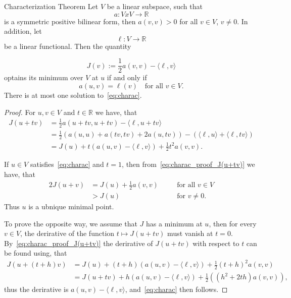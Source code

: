 
\begin{thmx}{Characterization Theorem}
\label{thm:charac_theorem}
    Let $V$ be a linear subspace, such that
        \[
            a: VxV \rightarrow \mathbb{R}
        \]
    is a symmetric positive bilinear form, then $a(v,v)>0$ for all $v \in V$, $v \neq 0$. In addition, let
        \[
            \ell: V \rightarrow \mathbb{R}
        \]
    be a linear functional. Then the quantity

        \[
            J(v):=\frac{1}{2} a(v,v) - \langle\ell,v\rangle 
        \]
    optains its minimum over $V$ at $u$ if and only if
        \begin{equation}
        \label{eq:charac}
            a(u,v) = \ell(v) \quad \text{for all } v \in V.
        \end{equation}
    There is at most one solution to~\eqref{eq:charac}.
\end{thmx}

\begin{proof}

    For $u,v \in V$ and $t \in \mathbb{R}$ we have, that
    \begin{align}
        J(u+tv) &= \frac{1}{2} a(u+tv,u+tv) - \langle\ell,u+tv\rangle \nonumber \\
        &= \frac{1}{2} \left( a(u,u) + a(tv,tv) + 2a(u,tv) \right) - \left( \langle \ell,u\rangle + \langle\ell,tv\rangle \right) \nonumber \\
        &= J(u) + t\left( a(u,v) - \langle\ell,v\rangle \right) + \frac{1}{2}t^2a(v,v). \label{eq:charac_proof_J(u+tv)}
    \end{align}

    If $u \in V$ satisfies~\eqref{eq:charac} and $t=1$, then from~\eqref{eq:charac_proof_J(u+tv)} we have, that
    \begin{alignat}{2}
        J(u+v) &= J(u) + \frac{1}{2}a(v,v) \quad &&\text{for all } v\in V  \nonumber \\
        &> J(u) \quad &&\text{for } v \neq 0.
    \end{alignat}
    Thus $u$ is a ubnique minimal point. 

    To prove the opposite way, we assume that $J$ has a minimum at $u$, then for every $v\in V$, the derirative of the function $t \mapsto J(u+tv)$ must vanish at $t=0$. 
    By~\eqref{eq:charac_proof_J(u+tv)} the derirative of $J(u+tv)$ with respect to $t$ can be found using, that
    \begin{align*}
          J(u+(t+h)v) &= J(u) + (t+h) (a(u,v) - \langle \ell,v\rangle) + \frac{1}{2}(t+h)^2 a(v,v) \\
          &= J(u+tv) + h(a(u,v) - \langle \ell,v\rangle) + \frac{1}{2}((h^2+2th)a(v,v)),
    \end{align*}
    thus the derirative is $a(u,v) - \langle \ell,v\rangle$, and~\eqref{eq:charac} then follows.
\end{proof}